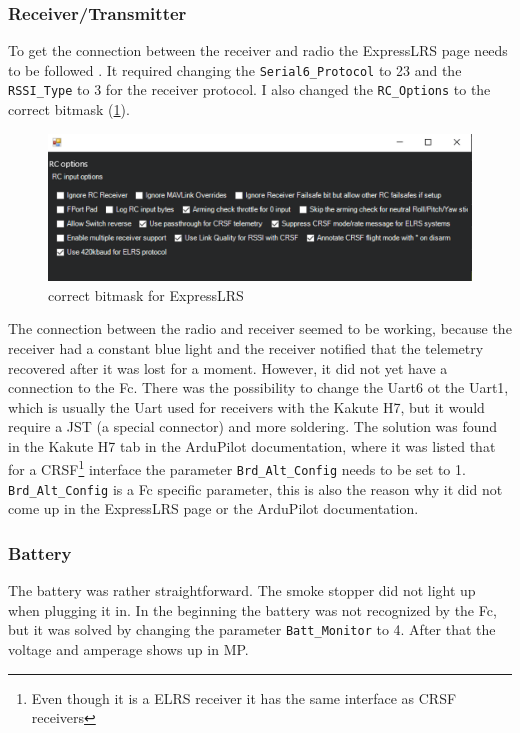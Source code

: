 \documentclass[svgnames]{article}
\begin{document}
	\subsubsection{Receiver/Transmitter}
	To get the connection between the receiver and radio the ExpressLRS page needs to be followed \cite{expresslrsorg}. It required changing the \lstinline|Serial6_Protocol| to 23 and the \lstinline|RSSI_Type| to 3 for the receiver protocol. I also changed the \lstinline|RC_Options| to the correct bitmask (\cref{fig:bitmask}).
\begin{figure}[ht]
	\centering
	\includegraphics[width=0.7\linewidth]{pictures/bitmask}
	\caption{correct bitmask for ExpressLRS}
	\label{fig:bitmask}
\end{figure}
	The connection between the radio and receiver seemed to be working, because the receiver had a constant blue light and the receiver notified that the telemetry recovered after it was lost for a moment. However, it did not yet have a connection to the Fc. There was the possibility to change the Uart6 ot the Uart1, which is usually the Uart used for receivers with the Kakute H7, but it would require a JST (a special connector) and more soldering. The solution was found in the Kakute H7 tab in the ArduPilot documentation, where it was listed that for a CRSF\footnote{Even though it is a ELRS receiver it has the same interface as CRSF receivers} interface the parameter \lstinline|Brd_Alt_Config| needs to be set to 1. \lstinline|Brd_Alt_Config| is a Fc specific parameter, this is also the reason why it did not come up in the ExpressLRS page or the ArduPilot documentation. 

	\subsubsection{Battery}
	The battery was rather straightforward. The smoke stopper did not light up when plugging it in. In the beginning the battery was not recognized by the \gls{Fc}, but it was solved by changing the parameter \lstinline|Batt_Monitor| to 4. After that the voltage and amperage shows up in \gls{MP}.
\end{document}
